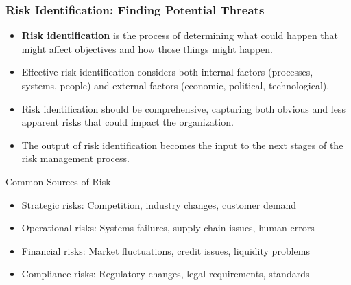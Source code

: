 \documentclass{beamer}
\begin{document}
\begin{frame}
\frametitle{Risk Identification: Finding Potential Threats}
\begin{itemize}
  \item \textbf{Risk identification} is the process of determining what could happen that might affect objectives and how those things might happen.
  \item Effective risk identification considers both internal factors (processes, systems, people) and external factors (economic, political, technological).
  \item Risk identification should be comprehensive, capturing both obvious and less apparent risks that could impact the organization.
  \item The output of risk identification becomes the input to the next stages of the risk management process.
\end{itemize}

\begin{block}{Common Sources of Risk}
\begin{itemize}
  \item Strategic risks: Competition, industry changes, customer demand
  \item Operational risks: Systems failures, supply chain issues, human errors
  \item Financial risks: Market fluctuations, credit issues, liquidity problems
  \item Compliance risks: Regulatory changes, legal requirements, standards
\end{itemize}
\end{block}
\end{frame}
\end{document}
